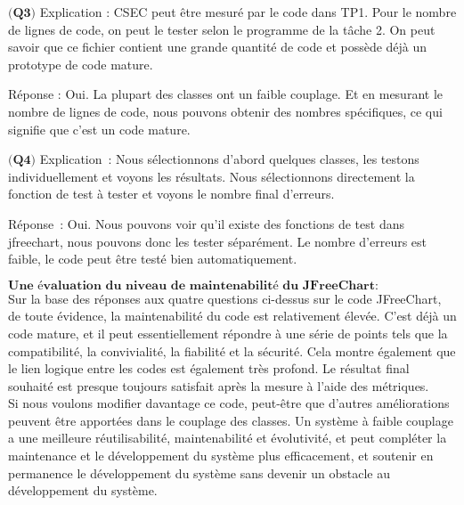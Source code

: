 \documentclass{article}
\begin{document}
\item$\textbf{(Q3)}$
Explication : CSEC peut être mesuré par le code dans TP1. Pour le nombre de lignes de code, on peut le tester selon le programme de la tâche 2. On peut savoir que ce fichier contient une grande quantité de code et possède déjà un prototype de code mature.

Réponse : Oui. La plupart des classes ont un faible couplage. Et en mesurant le nombre de lignes de code, nous pouvons obtenir des nombres spécifiques, ce qui signifie que c'est un code mature.

\item$\textbf{(Q4)}$
Explication : Nous sélectionnons d'abord quelques classes, les testons individuellement et voyons les résultats. Nous sélectionnons directement la fonction de test à tester et voyons le nombre final d'erreurs.

Réponse : Oui. Nous pouvons voir qu'il existe des fonctions de test dans jfreechart, nous pouvons donc les tester séparément. Le nombre d'erreurs est faible, le code peut être testé bien automatiquement.\\

\item$\textbf{Une évaluation du niveau de maintenabilité du JFreeChart:}$\\

Sur la base des réponses aux quatre questions ci-dessus sur le code JFreeChart, de toute évidence, la maintenabilité du code est relativement élevée. C'est déjà un code mature, et il peut essentiellement répondre à une série de points tels que la compatibilité, la convivialité, la fiabilité et la sécurité. Cela montre également que le lien logique entre les codes est également très profond. Le résultat final souhaité est presque toujours satisfait après la mesure à l'aide des métriques.\\

Si nous voulons modifier davantage ce code, peut-être que d'autres améliorations peuvent être apportées dans le couplage des classes. Un système à faible couplage a une meilleure réutilisabilité, maintenabilité et évolutivité, et peut compléter la maintenance et le développement du système plus efficacement, et soutenir en permanence le développement du système sans devenir un obstacle au développement du système.
\end{document}
